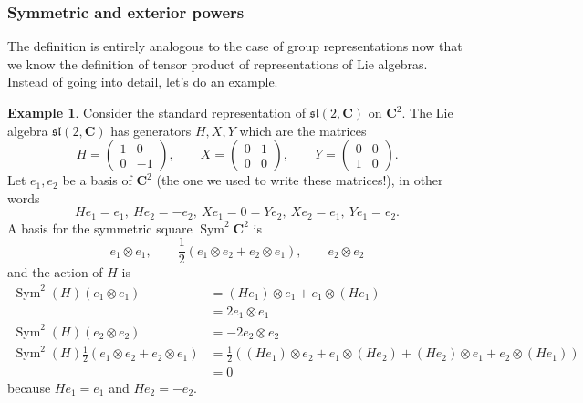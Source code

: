 \documentclass[12pt]{article}
\newcommand{\CC}{\mathbf{C}}
\newcommand{\OP}{\operatorname}
\newcommand{\Sym}{\OP{Sym}}
\theoremstyle{definition}
\newtheorem{exm}[thm]{Example}
\theoremstyle{check}
\theoremstyle{remark}
\theoremstyle{TheoremNum}
\begin{document}
\subsubsection{Symmetric and exterior powers}

The definition is entirely analogous to the case of group representations now that we know the definition of tensor product of representations of Lie algebras. Instead of going into detail, let's do an example.

\begin{exm}
Consider the standard representation of $\mathfrak{sl}(2,\CC)$ on $\CC^2$. The Lie algebra $\mathfrak{sl}(2,\CC)$ has generators $H,X,Y$ which are the matrices
\[H=\left(\begin{array}{cc}1 & 0\\ 0 & -1\end{array}\right),\qquad X=\left(\begin{array}{cc}0 & 1\\ 0 & 0\end{array}\right),\qquad Y=\left(\begin{array}{cc}0 & 0\\ 1 & 0\end{array}\right).\]
Let $e_1,e_2$ be a basis of $\CC^2$ (the one we used to write these matrices!), in other words
\[He_1=e_1,\ He_2=-e_2,\ Xe_1=0=Ye_2,\ Xe_2=e_1,\ Ye_1=e_2.\]
A basis for the symmetric square $\Sym^2\CC^2$ is
\[e_1\otimes e_1,\qquad\frac{1}{2}(e_1\otimes e_2+e_2\otimes e_1),\qquad e_2\otimes e_2\]
and the action of $H$ is
\begin{align*}
\Sym^2(H)(e_1\otimes e_1)&=(He_1)\otimes e_1+e_1\otimes(He_1)\\
&=2e_1\otimes e_1\\
\Sym^2(H)(e_2\otimes e_2)&=-2e_2\otimes e_2\\
\Sym^2(H)\frac{1}{2}(e_1\otimes e_2+e_2\otimes e_1)&=\frac{1}{2}((He_1)\otimes e_2+e_1\otimes(He_2)+(He_2)\otimes e_1+e_2\otimes(He_1))\\
&=0
\end{align*}
because $He_1=e_1$ and $He_2=-e_2$.


\end{exm}
\end{document}
